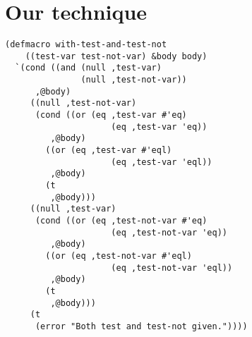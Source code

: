 \section{Our technique}

\begin{verbatim}
(defmacro with-test-and-test-not
    ((test-var test-not-var) &body body)
  `(cond ((and (null ,test-var)
               (null ,test-not-var))
	  ,@body)
	 ((null ,test-not-var)
	  (cond ((or (eq ,test-var #'eq)
                     (eq ,test-var 'eq))
		 ,@body)
		((or (eq ,test-var #'eql)
                     (eq ,test-var 'eql))
		 ,@body)
		(t
		 ,@body)))
	 ((null ,test-var)
	  (cond ((or (eq ,test-not-var #'eq)
                     (eq ,test-not-var 'eq))
		 ,@body)
		((or (eq ,test-not-var #'eql)
                     (eq ,test-not-var 'eql))
		 ,@body)
		(t
		 ,@body)))
	 (t
	  (error "Both test and test-not given."))))
\end{verbatim}
